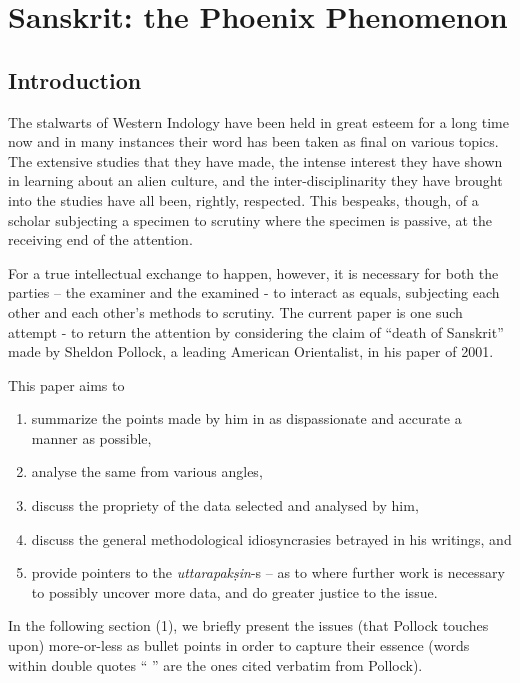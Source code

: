 \chapter{Sanskrit: the Phoenix Phenomenon}\label{chapter7}


\section*{Introduction}

The stalwarts of Western Indology have been held in great esteem for a long time now and in many instances their word has been taken as final on various topics. The extensive studies that they have made, the intense interest they have shown in learning about an alien culture, and the inter-disciplinarity they have brought into the studies have all been, rightly, respected. This bespeaks, though, of a scholar subjecting a specimen to scrutiny where the specimen is passive, at the receiving end of the attention. 

For a true intellectual exchange to happen, however, it is necessary for both the parties – the examiner and the examined - to interact as equals, subjecting each other and each other’s methods to scrutiny. The current paper is one such attempt  - to return the attention by considering the claim of “death of Sanskrit” made by Sheldon Pollock, a leading American Orientalist,  in his paper of 2001.

This paper aims to 
{\renewcommand\theenumi{\alph{enumi}}
\renewcommand\labelenumi{(\theenumi)}
\begin{enumerate}
\item summarize the points made by him in as dispassionate and accurate a manner as possible,
\item analyse the same from various angles,
\item discuss the propriety of the data selected and analysed by him,
\item discuss the general methodological idiosyncrasies betrayed in his writings, and 
\item provide pointers to the {\sl uttarapakṣin}-s – as to where further work is necessary to possibly uncover more data, and do greater justice to the issue.
\end{enumerate}}

In the following section (1), we briefly present the issues (that Pollock touches upon) more-or-less as bullet points in order to capture their essence (words within double quotes “ ” are the ones cited verbatim from Pollock). 


